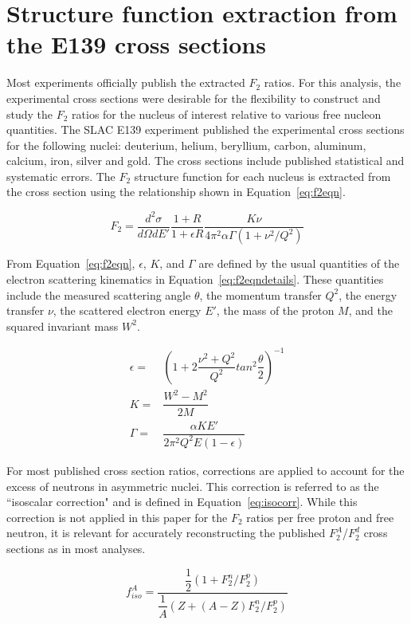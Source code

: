\documentclass[oneside]{article}
\begin{document}
\section{Structure function extraction from the E139 cross sections}

Most experiments officially publish the extracted $F_2$ ratios. For this analysis, the experimental cross sections were desirable for the flexibility to construct and study the $F_2$ ratios for the nucleus of interest relative to various free nucleon quantities. The SLAC E139 experiment published the experimental cross sections for the following nuclei: deuterium, helium, beryllium, carbon, aluminum, calcium, iron, silver and gold. The cross sections include published statistical and systematic errors. The $F_2$ structure function for each nucleus is extracted from the cross section using the relationship shown in Equation~\eqref{eq:f2eqn}.

\begin{equation}
F_2 = \dfrac{d^2\sigma}{d\Omega dE'}\dfrac{1+R}{1+\epsilon R}\dfrac{K\nu}{4\pi^2\alpha\Gamma (1+\nu^2/Q^2)}
\label{eq:f2eqn}
\end{equation}

From Equation~\eqref{eq:f2eqn}, $\epsilon$, $K$, and $\Gamma$ are defined by the usual quantities of the electron scattering kinematics in Equation~\eqref{eq:f2eqndetails}. These quantities include the measured scattering angle $\theta$, the momentum transfer $Q^2$, the energy transfer $\nu$, the scattered electron energy $E'$, the mass of the proton $M$, and the squared invariant mass $W^2$.

\begin{align}
\epsilon=&(1+2\dfrac{\nu^2+Q^2}{Q^2}tan^2\dfrac{\theta}{2})^{-1}\\
K=&\dfrac{W^2-M^2}{2M}\\
\Gamma=&\dfrac{\alpha KE'}{2\pi^2Q^2E(1-\epsilon)}
\label{eq:f2eqndetails}
\end{align}

For most published cross section ratios, corrections are applied to account for the excess of neutrons in asymmetric nuclei. This correction is referred to as the ``isoscalar correction" and is defined in Equation~\eqref{eq:isocorr}. While this correction is not applied in this paper for the $F_2$ ratios per free proton and free neutron, it is relevant for accurately reconstructing the published $F_2^A$/$F_2^d$ cross sections as in most analyses. 

\begin{equation}
f_{iso}^A = \dfrac{\dfrac{1}{2}(1+F_2^n/F_2^p)}{\dfrac{1}{A}(Z+(A-Z)F_2^n/F_2^p)}
\label{eq:isocorr}
\end{equation}
\end{document}
